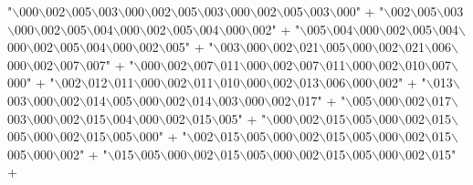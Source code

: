 \begin{DoxyCode}
    \textcolor{stringliteral}{"\(\backslash\)000\(\backslash\)002\(\backslash\)005\(\backslash\)003\(\backslash\)000\(\backslash\)002\(\backslash\)005\(\backslash\)003\(\backslash\)000\(\backslash\)002\(\backslash\)005\(\backslash\)003\(\backslash\)000"} +
    \textcolor{stringliteral}{"\(\backslash\)002\(\backslash\)005\(\backslash\)003\(\backslash\)000\(\backslash\)002\(\backslash\)005\(\backslash\)004\(\backslash\)000\(\backslash\)002\(\backslash\)005\(\backslash\)004\(\backslash\)000\(\backslash\)002"} +
    \textcolor{stringliteral}{"\(\backslash\)005\(\backslash\)004\(\backslash\)000\(\backslash\)002\(\backslash\)005\(\backslash\)004\(\backslash\)000\(\backslash\)002\(\backslash\)005\(\backslash\)004\(\backslash\)000\(\backslash\)002\(\backslash\)005"} +
    \textcolor{stringliteral}{"\(\backslash\)003\(\backslash\)000\(\backslash\)002\(\backslash\)021\(\backslash\)005\(\backslash\)000\(\backslash\)002\(\backslash\)021\(\backslash\)006\(\backslash\)000\(\backslash\)002\(\backslash\)007\(\backslash\)007"} +
    \textcolor{stringliteral}{"\(\backslash\)000\(\backslash\)002\(\backslash\)007\(\backslash\)011\(\backslash\)000\(\backslash\)002\(\backslash\)007\(\backslash\)011\(\backslash\)000\(\backslash\)002\(\backslash\)010\(\backslash\)007\(\backslash\)000"} +
    \textcolor{stringliteral}{"\(\backslash\)002\(\backslash\)012\(\backslash\)011\(\backslash\)000\(\backslash\)002\(\backslash\)011\(\backslash\)010\(\backslash\)000\(\backslash\)002\(\backslash\)013\(\backslash\)006\(\backslash\)000\(\backslash\)002"} +
    \textcolor{stringliteral}{"\(\backslash\)013\(\backslash\)003\(\backslash\)000\(\backslash\)002\(\backslash\)014\(\backslash\)005\(\backslash\)000\(\backslash\)002\(\backslash\)014\(\backslash\)003\(\backslash\)000\(\backslash\)002\(\backslash\)017"} +
    \textcolor{stringliteral}{"\(\backslash\)005\(\backslash\)000\(\backslash\)002\(\backslash\)017\(\backslash\)003\(\backslash\)000\(\backslash\)002\(\backslash\)015\(\backslash\)004\(\backslash\)000\(\backslash\)002\(\backslash\)015\(\backslash\)005"} +
    \textcolor{stringliteral}{"\(\backslash\)000\(\backslash\)002\(\backslash\)015\(\backslash\)005\(\backslash\)000\(\backslash\)002\(\backslash\)015\(\backslash\)005\(\backslash\)000\(\backslash\)002\(\backslash\)015\(\backslash\)005\(\backslash\)000"} +
    \textcolor{stringliteral}{"\(\backslash\)002\(\backslash\)015\(\backslash\)005\(\backslash\)000\(\backslash\)002\(\backslash\)015\(\backslash\)005\(\backslash\)000\(\backslash\)002\(\backslash\)015\(\backslash\)005\(\backslash\)000\(\backslash\)002"} +
    \textcolor{stringliteral}{"\(\backslash\)015\(\backslash\)005\(\backslash\)000\(\backslash\)002\(\backslash\)015\(\backslash\)005\(\backslash\)000\(\backslash\)002\(\backslash\)015\(\backslash\)005\(\backslash\)000\(\backslash\)002\(\backslash\)015"} +

\end{DoxyCode}
